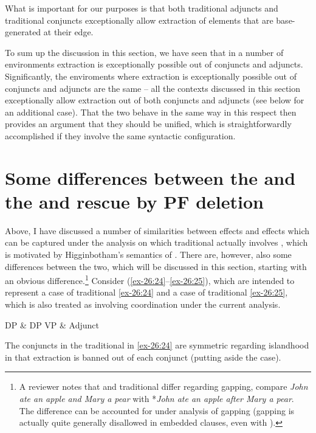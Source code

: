 \documentclass[output=paper]{langsci/langscibook}
\begin{document}
What is important for our purposes is that both traditional adjuncts and
traditional conjuncts exceptionally allow extraction of elements that are
base-ge\-ne\-rat\-ed at their edge.

To sum up the discussion in this section, we have seen that in a number of
environments extraction is exceptionally possible out of conjuncts and
adjuncts. Significantly, the enviroments where extraction is exceptionally
possible out of conjuncts and adjuncts are the same – all the contexts
discussed in this section exceptionally allow extraction out of both conjuncts
and adjuncts (see below for an additional case). That the two behave in the
same way in this respect then provides an argument that they should be unified,
which is straightforwardly accomplished if they involve the same syntactic
configuration.

\section{Some differences between the  and the
 and rescue by PF deletion}

Above, I have discussed a number of similarities between 
effects and  effects which can be captured under the analysis
on which traditional  actually involves , which is
motivated by Higginbotham’s semantics of . There are, however, also
some differences between the two, which will be discussed in this section,
starting with an obvious difference.\footnote{A reviewer notes that
     and traditional  differ regarding gapping, compare
    \emph{John ate an apple and Mary a pear} with *\emph{John ate an apple
    after Mary a pear}. The difference can be accounted for under  analysis of gapping (gapping is actually quite generally disallowed
in embedded clauses, even with ).} Consider (\ref{ex-26:24}--\ref{ex-26:25}), which are
intended to represent a case of traditional  \eqref{ex-26:24} and a case of
traditional  \eqref{ex-26:25}, which is also treated as involving coordination
under the current analysis.

\ea\label{ex-26:24} DP \& DP
\ex\label{ex-26:25} VP \& Adjunct
\z

The conjuncts in the traditional  in \eqref{ex-26:24} are symmetric regarding
islandhood in that extraction is banned out of each conjunct (putting aside the
 case).
\end{document}
